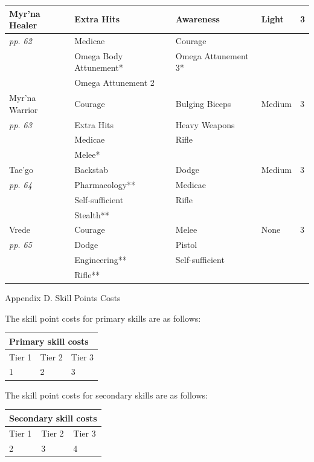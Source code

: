 \begin{table}
\begin{tabular}{|l|l|l|l|l|} \hline 
Myr'na Healer & Extra Hits & Awareness & Light & 3 \\
 \hline \textit{pp. 62} & Medicae & Courage &  &  \\
 \hline  & Omega Body Attunement* & Omega Attunement 3* &  &  \\
 \hline  & Omega Attunement 2 &  &  &  \\
 \hline Myr'na Warrior & Courage & Bulging Biceps & Medium & 3 \\
 \hline \textit{pp. 63} & Extra Hits & Heavy Weapons &  &  \\
 \hline  & Medicae & Rifle &  &  \\
 \hline  & Melee* &  &  &  \\
 \hline Tae'go & Backstab & Dodge & Medium & 3 \\
 \hline \textit{pp. 64} & Pharmacology** & Medicae &  &  \\
 \hline  & Self-sufficient & Rifle &  &  \\
 \hline  & Stealth** &  &  &  \\
 \hline Vrede & Courage & Melee & None & 3 \\
 \hline \textit{pp. 65} & Dodge & Pistol &  &  \\
 \hline  & Engineering** & Self-sufficient &  &  \\
 \hline  & Rifle** &  &  &  \\
 \hline \end{tabular}

\end{table}

Appendix D. Skill Points Costs

The skill point costs for primary skills are as follows:

\begin{table}
\begin{tabular}{|l|l|l|} \hline 
\multicolumn{3}{|l|}{Primary skill costs} \\
 \hline Tier 1 & Tier 2 & Tier 3 \\
 \hline 1 & 2 & 3 \\
 \hline \end{tabular}

\end{table}

The skill point costs for secondary skills are as follows:

\begin{table}
\begin{tabular}{|l|l|l|} \hline 
\multicolumn{3}{|l|}{Secondary skill costs} \\
 \hline Tier 1 & Tier 2 & Tier 3 \\
 \hline 2 & 3 & 4 \\
 \hline \end{tabular}

\end{table}

